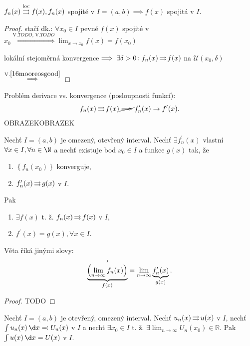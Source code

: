 \begin{dusledek}
    $f_n(x)\stackrel{\text{loc}}{\operatorname{\rightrightarrows}}f(x), f_n(x)$ spojité v $I=(a,b) \implies f(x)$ spojitá v $I$.
\end{dusledek}

\begin{proof}
    stačí dk.: $\forall x_0 \in I$ pevné $f(x)$ spojité v $x_0 \stackrel{\text{V.}TODO\text{, V.}TODO}{\iff}\lim_{x\to x_0} f(x) = f(x_0)$

    lokální stejoměrná konvergence$\implies \exists \delta>0\colon f_n(x) \operatorname{\rightrightarrows} f(x)$ na $\mathscr U(x_0, \delta)$

    $\stackrel{\text{V.}\ref{16mooreosgood}}{\implies}$
\end{proof}

\begin{poznamka}
    Problém derivace vs. konvergence (posloupnosti funkcí):
    $$f_n(x)\operatorname{\rightrightarrows} f(x)\cancel{\implies}f_n^\prime(x)\to f^\prime(x).$$
    OBRAZEKOBRAZEK
\end{poznamka}

\begin{veta}\label{16derivacecpc}
    Nechť $I = (a, b)$ je omezený, otevřený interval. Nechť $\exists f^\prime_n(x)$ vlastní $\forall x \in I, \forall n \in \N$ a nechť existuje bod $x_0 \in I$ a funkce $g(x)$ tak, že
    \begin{enumerate}[1.]
        \item $\left\{f_n(x_0)\right\}$ konverguje,
        \item $f^\prime_n(x)\operatorname{\rightrightarrows} g(x)$ v $I$.
    \end{enumerate}
    Pak
    \begin{enumerate}[1.]
        \item $\exists f(x)$ t. ž. $f_n(x)\operatorname{\rightrightarrows} f(x)$ v $I$,
        \item $f^\prime(x)=g(x), \forall x \in I$.
    \end{enumerate}
\end{veta}

\begin{poznamka}
    Věta říká jinými slovy:
    $$\underbrace{\left(\lim_{n\to\infty}f_n(x)\right)}_{\mathclap{f(x)}}^\prime=\lim_{n\to\infty}\underbrace{f_n^\prime(x)}_{\mathclap{g(x)}}.$$
\end{poznamka}

\begin{proof}
    TODO
\end{proof}

\renewcommand{\theveta}{\arabic{section}.$\arabic{veta}^\prime$}
\setcounter{veta}{4}
\begin{veta}
    Nechť $I=(a,b)$ je otevřený, omezený interval. Nechť $u_n(x) \operatorname{\rightrightarrows} u(x)$ v $I$, nechť $\int u_n(x) \,\d x \eqcolon U_n(x)$ v $I$ a nechť $\exists x_0 \in I$ t. ž. $\exists \lim_{n\to\infty}U_n(x_0)\in \mathbb R$. Pak $\int u(x) \,\d x = U(x)$ v $I$.
\end{veta}
\renewcommand{\theveta}{\arabic{section}.\arabic{veta}}
\setcounter{veta}{5}


